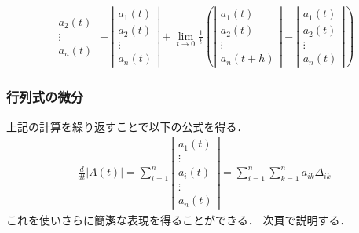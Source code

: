 \documentclass[10pt,usepdftitle=false,hyperref={unicode}]{beamer}
\newcommand{\absolute}[1]{\left|#1\right|}
\newcommand{\parentheses}[1]{\left(#1\right)}
\begin{document}
\begin{frame}
\begin{align*}
{\begin{array}{c}
                a_2\parentheses{t} \\
                \vdots \\
                a_n\parentheses{t}
            \end{array}
    }
    +
    \absolute{%
            \begin{array}{c}
                a_1\parentheses{t} \\
                \dot{a}_2\parentheses{t} \\
                \vdots \\
                a_n\parentheses{t}
            \end{array}
    }
    + \lim_{t \to 0}\frac{1}{t}
    \parentheses{%
        \absolute{%
            \begin{array}{c}
                a_1\parentheses{t} \\
                a_2\parentheses{t} \\
                \vdots \\
                a_n\parentheses{t + h}
            \end{array}
        }
        -
        \absolute{%
            \begin{array}{c}
                a_1\parentheses{t} \\
                a_2\parentheses{t} \\
                \vdots \\
                a_n\parentheses{t}
            \end{array}
        }
    }
\end{align*}
\end{frame}

\begin{frame}
\frametitle{行列式の微分}
上記の計算を繰り返すことで以下の公式を得る．
\begin{align*}
    \frac{d}{dt}\absolute{A\parentheses{t}}
    = \sum_{i = 1}^n \absolute{%
        \begin{array}{c}
            a_1\parentheses{t} \\
            \vdots \\
            \dot{a}_i\parentheses{t} \\
            \vdots \\
            a_n\parentheses{t}
        \end{array}
    }
    = \sum_{i = 1}^n \sum_{k = 1}^n \dot{a}_{ik} \varDelta_{ik}
\end{align*}
これを使いさらに簡潔な表現を得ることができる．
次頁で説明する．
\end{frame}
\end{document}
